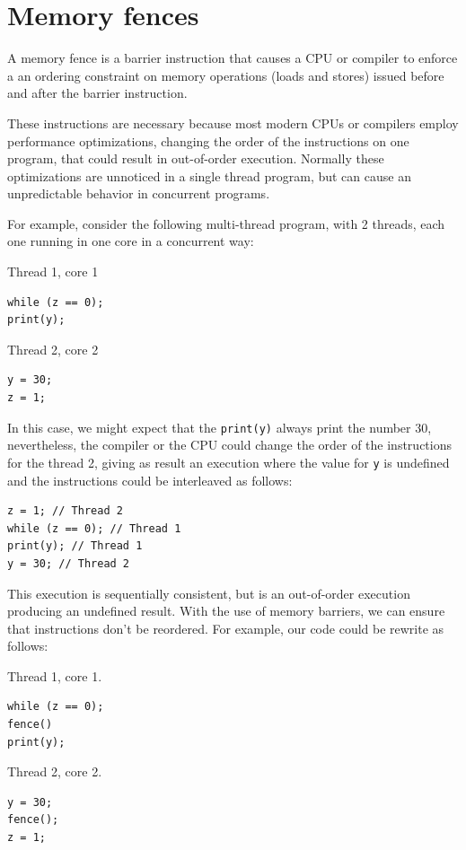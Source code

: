 \documentclass[openany, a4paper]{book}
\theoremstyle{break}
\theoremstyle{example}
\theoremstyle{note}
\theoremstyle{break}
\theoremstyle{exercise}
\begin{document}
\section{Memory fences}
\label{sec:org906d2eb}

A memory fence is a barrier instruction that causes a CPU or compiler to
enforce a an ordering constraint on memory operations (loads and stores)
issued before and after the barrier instruction.

These instructions are necessary because most modern CPUs or compilers
employ performance optimizations, changing the order of the instructions on
one program, that could result in out-of-order execution. Normally these
optimizations are unnoticed in a single thread program, but can cause an
unpredictable behavior in concurrent programs.

For example, consider the following multi-thread program, with 2
threads, each one running in one core in a concurrent way:

Thread 1, core 1
\begin{verbatim}
while (z == 0);
print(y);
\end{verbatim}

Thread 2, core 2
\begin{verbatim}
y = 30;
z = 1;
\end{verbatim}

In this case, we might expect that the \texttt{print(y)} always print the number 30,
nevertheless, the compiler or the CPU could change the order of the
instructions for the thread 2, giving as result an execution where the value
for \texttt{y} is undefined and the instructions could be interleaved as follows:

\begin{verbatim}
z = 1; // Thread 2
while (z == 0); // Thread 1
print(y); // Thread 1
y = 30; // Thread 2
\end{verbatim}

This execution is sequentially consistent, but is an out-of-order
execution producing an undefined result. With the use of memory barriers, we
can ensure that instructions don't be reordered. For example, our code could
be rewrite as follows:

Thread 1, core 1.
\begin{verbatim}
while (z == 0);
fence()
print(y);
\end{verbatim}

Thread 2, core 2.
\begin{verbatim}
y = 30;
fence();
z = 1;
\end{verbatim}
\end{document}
